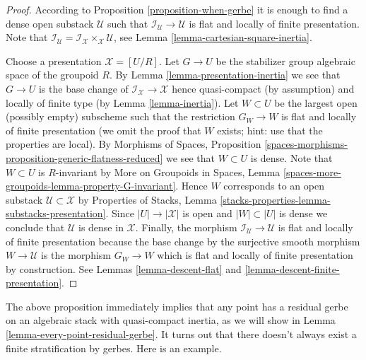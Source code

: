 \begin{proof}
According to
Proposition \ref{proposition-when-gerbe}
it is enough to find a dense open substack $\mathcal{U}$ such that
$\mathcal{I}_\mathcal{U} \to \mathcal{U}$ is flat and locally of finite
presentation. Note that
$\mathcal{I}_\mathcal{U} =
\mathcal{I}_\mathcal{X} \times_\mathcal{X} \mathcal{U}$, see
Lemma \ref{lemma-cartesian-square-inertia}.

\medskip\noindent
Choose a presentation $\mathcal{X} = [U/R]$. Let $G \to U$ be the stabilizer
group algebraic space of the groupoid $R$. By
Lemma \ref{lemma-presentation-inertia}
we see that $G \to U$ is the base change of
$\mathcal{I}_\mathcal{X} \to \mathcal{X}$ hence quasi-compact (by assumption)
and locally of finite type (by
Lemma \ref{lemma-inertia}).
Let $W \subset U$ be the largest open (possibly empty) subscheme such that
the restriction $G_W \to W$ is flat and locally of finite presentation
(we omit the proof that $W$ exists; hint: use that the properties are local).
By
Morphisms of Spaces, Proposition
\ref{spaces-morphisms-proposition-generic-flatness-reduced}
we see that $W \subset U$ is dense. Note that $W \subset U$ is $R$-invariant
by
More on Groupoids in Spaces, Lemma
\ref{spaces-more-groupoids-lemma-property-G-invariant}.
Hence $W$ corresponds to an open substack $\mathcal{U} \subset \mathcal{X}$ by
Properties of Stacks, Lemma
\ref{stacks-properties-lemma-substacks-presentation}.
Since $|U| \to |\mathcal{X}|$ is open and $|W| \subset |U|$ is dense we
conclude that $\mathcal{U}$ is dense in $\mathcal{X}$.
Finally, the morphism $\mathcal{I}_\mathcal{U} \to \mathcal{U}$
is flat and locally of finite presentation because the base change by
the surjective smooth morphism $W \to \mathcal{U}$ is the morphism
$G_W \to W$ which is flat and locally of finite presentation by construction.
See
Lemmas \ref{lemma-descent-flat} and
\ref{lemma-descent-finite-presentation}.
\end{proof}

\noindent
The above proposition immediately implies that any point has a residual
gerbe on an algebraic stack with quasi-compact inertia, as we will show in
Lemma \ref{lemma-every-point-residual-gerbe}.
It turns out that there doesn't always exist a finite stratification
by gerbes. Here is an example.

